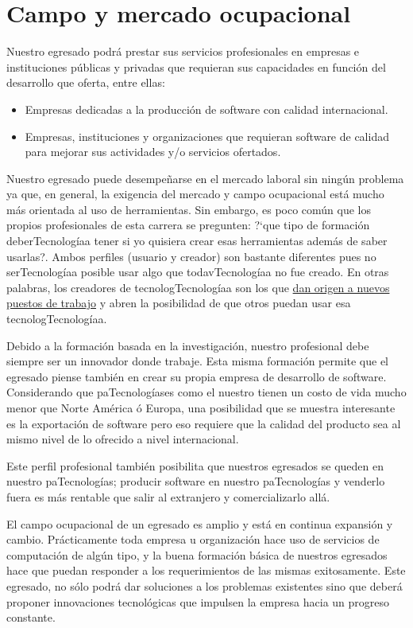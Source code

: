 \section{Campo y mercado ocupacional}\label{sec:campo-ocupacional}
Nuestro egresado podrá prestar sus servicios profesionales en empresas e instituciones públicas y privadas que requieran sus capacidades en función del desarrollo que oferta, entre ellas:

\begin{itemize}
\item Empresas dedicadas a la producción de software con calidad internacional.
\item Empresas, instituciones y organizaciones que requieran software de calidad para mejorar sus actividades y/o servicios ofertados.
\end{itemize}

Nuestro egresado puede desempeñarse en el mercado laboral sin ningún problema ya que, en general, la exigencia del mercado y campo ocupacional está mucho más orientada al uso de herramientas. Sin embargo, es poco común que los propios profesionales de esta carrera se pregunten: ?`que tipo de formación deberTecnologíaa tener si yo quisiera crear esas herramientas además de saber usarlas?. Ambos perfiles (usuario y creador) son bastante diferentes pues no serTecnologíaa posible usar algo que todavTecnologíaa no fue creado. En otras palabras, los creadores de tecnologTecnologíaa son los que \underline{dan origen a nuevos puestos de trabajo} y abren la posibilidad de que otros puedan usar esa tecnologTecnologíaa.

Debido a la formación basada en la investigación, nuestro profesional debe siempre ser un innovador donde trabaje. Esta misma formación permite que el egresado piense también en crear su propia empresa de desarrollo de software. Considerando que paTecnologíases como el nuestro tienen un costo de vida mucho menor que Norte América ó Europa, una posibilidad que se muestra interesante es la exportación de software pero eso requiere que la calidad del producto sea al mismo nivel de lo ofrecido a nivel internacional.

Este perfil profesional también posibilita que nuestros egresados se queden en nuestro paTecnologías; producir software en nuestro paTecnologías y venderlo fuera es más rentable que salir al extranjero y comercializarlo allá.

El campo ocupacional de un egresado es amplio y está en continua expansión y cambio. Prácticamente toda empresa u organización hace uso de servicios de computación de algún tipo, y la buena formación básica de nuestros egresados hace que puedan responder a los requerimientos de las mismas exitosamente. Este egresado, no sólo podrá dar soluciones a los problemas existentes sino que deberá proponer innovaciones tecnológicas que impulsen la empresa hacia un progreso constante.

